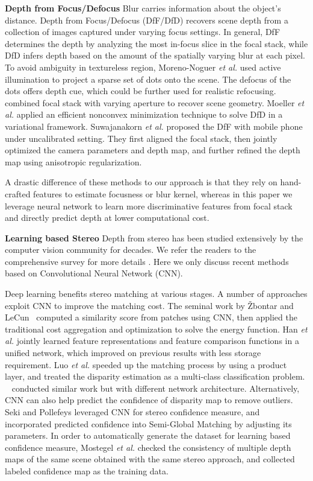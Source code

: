 \documentclass[10pt,twocolumn,letterpaper]{article}
\begin{document}
\noindent\textbf{Depth from Focus/Defocus}
Blur carries information about the object's distance. Depth from Focus/Defocus (DfF/DfD) recovers scene depth from a collection of images captured under varying focus settings. In general, DfF \cite{nayar92, nayar94, malik07} determines the depth by analyzing the most in-focus slice in the focal stack, while DfD \cite{favaro05, favaro07} infers depth based on the amount of the spatially varying blur at each pixel. To avoid ambiguity in textureless region, Moreno-Noguer \emph{et al.} \cite{Moreno-Noguer07} used active illumination to project a sparse set of dots onto the scene. The defocus of the dots offers depth cue, which could be further used for realistic refocusing. \cite{hasinoff09} combined focal stack with varying aperture to recover scene geometry. Moeller \emph{et al.} \cite{moeller15} applied an efficient nonconvex minimization technique to solve DfD in a variational framework. Suwajanakorn \emph{et al.} \cite{suwajanakorn15} proposed the DfF with mobile phone under uncalibrated setting. They first aligned the focal stack, then jointly optimized the camera parameters and depth map, and further refined the depth map using anisotropic regularization.

A drastic difference of these methods to our approach is that they rely on hand-crafted features to estimate focusness or blur kernel, whereas in this paper we leverage neural network to learn more discriminative features from focal stack and directly predict depth at lower computational cost.

\noindent \textbf{Learning based Stereo}
Depth from stereo has been studied extensively by the computer vision community for decades. We refer the readers to the comprehensive survey for more details \cite{scharstein02, brown03}. Here we only discuss recent methods based on Convolutional Neural Network (CNN).

Deep learning benefits stereo matching at various stages. A number of approaches exploit CNN to improve the matching cost. The seminal work by {\v Z}bontar and LeCun~\cite{zbontar15} computed a similarity score from patches using CNN, then applied the traditional cost aggregation and optimization to solve the energy function. Han \emph{et al.}\cite{han2015matchnet} jointly learned feature representations and feature comparison functions in a unified network, which improved on previous results with less storage requirement. Luo \emph{et al.} \cite{luo16} speeded up the matching process by using a product layer, and treated the disparity estimation as a multi-class classification problem. ~\cite{chen2015deep, zagoruyko15, liu2016euclidean, park2016look} conducted similar work but with different network architecture. Alternatively, CNN can also help predict the confidence of disparity map to remove outliers. Seki and Pollefeys \cite{seki2016patch} leveraged CNN for stereo confidence measure, and incorporated predicted confidence into Semi-Global Matching by adjusting its parameters. In order to automatically generate the dataset for learning based confidence measure, Mostegel \emph{et al.} \cite{mostegel16} checked the consistency of multiple depth maps of the same scene obtained with the same stereo approach, and collected labeled confidence map as the training data.
\end{document}
